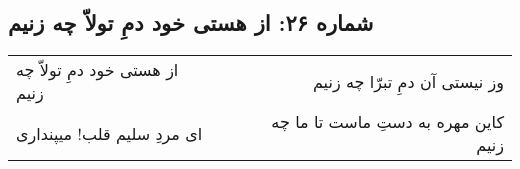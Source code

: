 \begin{center}
\section*{شماره ۲۶: از هستی خود دمِ تولاّ چه زنیم}
\label{sec:026}
\begin{longtable}{l p{0.5cm} r}
از هستی خود دمِ تولاّ چه زنیم
&&
وز نیستی آن دمِ تبرّا چه زنیم
\\
ای مردِ سلیم قلب! میپنداری
&&
کاین مهره به دستِ ماست تا ما چه زنیم
\\
\end{longtable}
\end{center}
